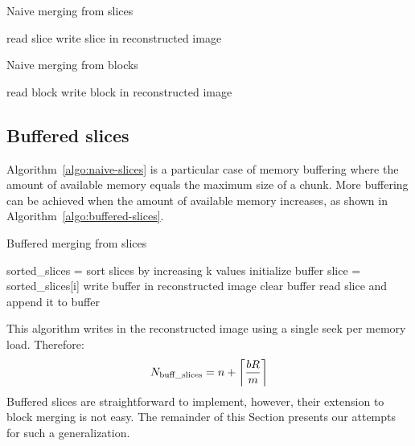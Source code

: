 \documentclass[10pt, conference, compsocconf]{IEEEtran}
\DeclarePairedDelimiter{\ceil}{\lceil}{\rceil}
\begin{document}
\begin{algorithm}
\caption{Naive merging from slices}
\label{algo:naive-slices} 
\begin{algorithmic}
    \STATE read slice
    \STATE write slice in reconstructed image
  \ENDFOR      
\end{algorithmic}
\end{algorithm}
\begin{algorithm}[h]
\caption{Naive merging from blocks}
\label{algo:naive-blocks}
\begin{algorithmic}
    \STATE read block
    \STATE write block in reconstructed image
  \ENDFOR 
\end{algorithmic}
\end{algorithm}


\subsection{Buffered slices}

Algorithm~\ref{algo:naive-slices} is a particular case of memory
buffering where the amount of available memory equals the maximum size
of a chunk. More buffering can be achieved when the amount of
available memory increases, as shown in
Algorithm~\ref{algo:buffered-slices}.
\begin{algorithm}[h]
  \caption{Buffered merging from slices}
  \label{algo:buffered-slices}
  \begin{algorithmic}[1]
    \STATE sorted\_slices = sort slices by increasing k values
    \STATE initialize buffer
      \STATE slice = sorted\_slices[i]
        \STATE write buffer in reconstructed image
        \STATE clear buffer
      \ENDIF
      \STATE read slice and append it to buffer
    \ENDFOR
  \end{algorithmic}
\end{algorithm}
This algorithm writes in the reconstructed image using a single seek
per memory load. Therefore:
\begin{equation}
N_\mathrm{buff\_slices} =  n + \ceil*{\frac{bR}{m}} \label{eq:buff-slices}
\end{equation}
Buffered slices are straightforward to implement, however, their
extension to block merging is not easy. The remainder of this Section
presents our attempts for such a generalization.
\end{document}
